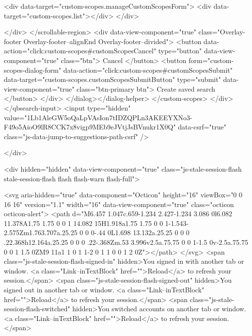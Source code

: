         <div data-target="custom-scopes.manageCustomScopesForm">
          <div data-target="custom-scopes.list"></div>
        </div>

</div>
      </scrollable-region>
      <div data-view-component="true" class="Overlay-footer Overlay-footer--alignEnd Overlay-footer--divided">          <button data-action="click:custom-scopes#customScopesCancel" type="button" data-view-component="true" class="btn">    Cancel
</button>
          <button form="custom-scopes-dialog-form" data-action="click:custom-scopes#customScopesSubmit" data-target="custom-scopes.customScopesSubmitButton" type="submit" data-view-component="true" class="btn-primary btn">    Create saved search
</button>
</div>
</dialog></dialog-helper>
    </custom-scopes>
  </div>
</qbsearch-input>  <input type="hidden" value="1Lb1AleGW5oQaLpVAsIon7tIDZQPLn3AKEEYXNo3-F49o5AioO9lR8CCK7x8vigp9MEb9eJVtjJsBVnukr1X0Q" data-csrf="true" class="js-data-jump-to-suggestions-path-csrf" />


      </div>


      <div hidden="hidden" data-view-component="true" class="js-stale-session-flash stale-session-flash flash flash-warn flash-full">
  
        <svg aria-hidden="true" data-component="Octicon" height="16" viewBox="0 0 16 16" version="1.1" width="16" data-view-component="true" class="octicon octicon-alert">
    <path d="M6.457 1.047c.659-1.234 2.427-1.234 3.086 0l6.082 11.378A1.75 1.75 0 0 1 14.082 15H1.918a1.75 1.75 0 0 1-1.543-2.575Zm1.763.707a.25.25 0 0 0-.44 0L1.698 13.132a.25.25 0 0 0 .22.368h12.164a.25.25 0 0 0 .22-.368Zm.53 3.996v2.5a.75.75 0 0 1-1.5 0v-2.5a.75.75 0 0 1 1.5 0ZM9 11a1 1 0 1 1-2 0 1 1 0 0 1 2 0Z"></path>
</svg>
        <span class="js-stale-session-flash-signed-in" hidden>You signed in with another tab or window. <a class="Link--inTextBlock" href="">Reload</a> to refresh your session.</span>
        <span class="js-stale-session-flash-signed-out" hidden>You signed out in another tab or window. <a class="Link--inTextBlock" href="">Reload</a> to refresh your session.</span>
        <span class="js-stale-session-flash-switched" hidden>You switched accounts on another tab or window. <a class="Link--inTextBlock" href="">Reload</a> to refresh your session.</span>

